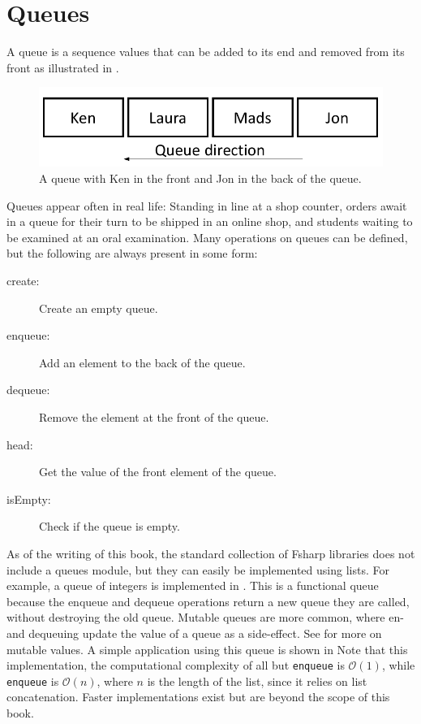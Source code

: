 \documentclass[fsharpNotes.tex]{subfiles}
\begin{document}
\section{Queues}
A queue is a sequence values that can be added to its end and removed from its front as illustrated in .
\begin{figure}
  \centering
  \includegraphics[width=0.6\linewidth]{queue}
  \caption{A queue with Ken in the front and Jon in the back of the queue.}
  \label{fig:queue}
\end{figure}
Queues appear often in real life: Standing in line at a shop counter, orders await in a queue for their turn to be shipped in an online shop, and students waiting to be examined at an oral examination. Many operations on queues can be defined, but the following are always present in some form:
\begin{description}
\item[create:] Create an empty queue.
\item[enqueue:] Add an element to the back of the queue.
\item[dequeue:] Remove the element at the front of the queue.
\item[head:] Get the value of the front element of the queue.
\item[isEmpty:] Check if the queue is empty.
\end{description}
As of the writing of this book, the standard collection of Fsharp libraries does not include a queues module, but they can easily be implemented using lists. For example, a queue of integers is implemented in .
%
%
This is a functional queue because the enqueue and dequeue operations return a new queue they are called, without destroying the old queue. Mutable queues are more common, where en- and dequeuing update the value of a queue as a side-effect. See  for more on mutable values. A simple application using this queue is shown in 
%
%
Note that this implementation, the computational complexity of all but \lstinline{enqueue} is $\mathcal{O}(1)$, while \lstinline{enqueue} is $\mathcal{O}(n)$, where $n$ is the length of the list, since it relies on list concatenation. Faster implementations exist but are beyond the scope of this book.
\end{document}
